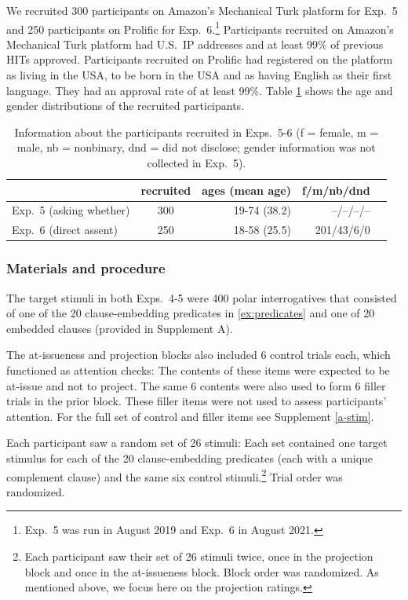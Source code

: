 \documentclass[times,linguex,xcolor]{glossa}
\begin{document}
We recruited 300 participants on Amazon's Mechanical Turk platform for Exp.~5 and 250 participants on Prolific for Exp.~6.\footnote{Exp.~5 was run in August 2019 and Exp.~6 in August 2021.} Participants recruited on Amazon's Mechanical Turk platform had U.S.\ IP addresses and at least 99\% of previous HITs approved. Participants recruited on Prolific had registered on the platform as living in the USA, to be born in the USA and as having English as their first language. They had an approval rate of at least 99\%.  Table \ref{t:recruited2} shows the age and gender distributions of the recruited participants.

    \begin{table}[h!]
    \centering
    \begin{tabular}{l | c | r r r }
                & recruited & ages (mean age) & f/m/nb/dnd \\ \hline
    Exp.~5 (asking whether) & 300 & 19-74 (38.2) & --/--/--/--  \\
    Exp.~6 (direct assent) & 250 & 18-58 (25.5)  & 201/43/6/0  \\
    \hline
    \end{tabular}

    \caption{Information about the participants recruited in Exps.~5-6 (f = female, m = male, nb = nonbinary, dnd = did not disclose; gender information was not collected in Exp.~5).}\label{t:recruited2}
    \end{table}

  \subsubsection{Materials and procedure}
  
The target stimuli in both Exps.~4-5 were 400 polar interrogatives that consisted of one of the 20 clause-embedding predicates in \ref{ex:predicates} and one of 20 embedded clauses (provided in Supplement A). 
  
  
  The at-issueness and projection blocks also included 6 control trials each, which functioned as attention checks: The contents of these items were expected to be at-issue and not to project. The same 6 contents were also used to form 6 filler trials in the prior block. These filler items were not used to assess participants' attention. For the full set of control and filler items see Supplement \ref{a-stim}.

            Each participant saw a random set of 26 stimuli: Each set contained one target stimulus for each of the 20 clause-embedding predicates (each with a unique complement clause) and the same six control stimuli.\footnote{Each participant saw their set of 26 stimuli twice, once in the projection block and once in the at-issueness block. Block order was randomized. As mentioned above, we focus here on the projection ratings.} Trial order was randomized.
	
\end{document}
